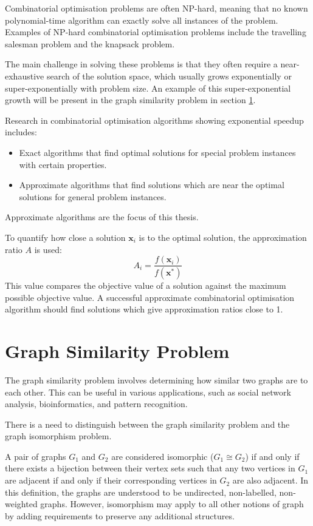 Combinatorial optimisation problems are often NP-hard, meaning that no known polynomial-time algorithm can exactly solve all instances of the problem. Examples of NP-hard combinatorial optimisation problems include the travelling salesman problem and the knapsack problem.

The main challenge in solving these problems is that they often require a near-exhaustive search of the solution space, which usually grows exponentially or super-exponentially with problem size. An example of this super-exponential growth will be present in the graph similarity problem in section \ref{graph_sim_section}.

Research in combinatorial optimisation algorithms showing exponential speedup includes:
\begin{itemize}
    \item Exact algorithms that find optimal solutions for special problem instances with certain properties.
    \item Approximate algorithms that find solutions which are near the optimal solutions for general problem instances.
\end{itemize}

Approximate algorithms are the focus of this thesis.

To quantify how close a solution $\mathbf{x}_i$ is to the optimal solution, the approximation ratio $A$ is used:
$$A_i = \frac{f(\mathbf{x}_i)}{f(\mathbf{x}^*)}$$
This value compares the objective value of a solution against the maximum possible objective value. A successful approximate combinatorial optimisation algorithm should find solutions which give approximation ratios close to 1.

\section{Graph Similarity Problem}\label{graph_sim_section}
The graph similarity problem involves determining how similar two graphs are to each other. This can be useful in various applications, such as social network analysis, bioinformatics, and pattern recognition. 

There is a need to distinguish between the graph similarity problem and the graph isomorphism problem.

A pair of graphs $G_1$ and $G_2$ are considered isomorphic ($G_1\cong G_2$) if and only if there exists a bijection between their vertex sets such that any two vertices in $G_1$ are adjacent if and only if their corresponding vertices in $G_2$ are also adjacent. In this definition, the graphs are understood to be undirected, non-labelled, non-weighted graphs. However, isomorphism may apply to all other notions of graph by adding requirements to preserve any additional structures.

